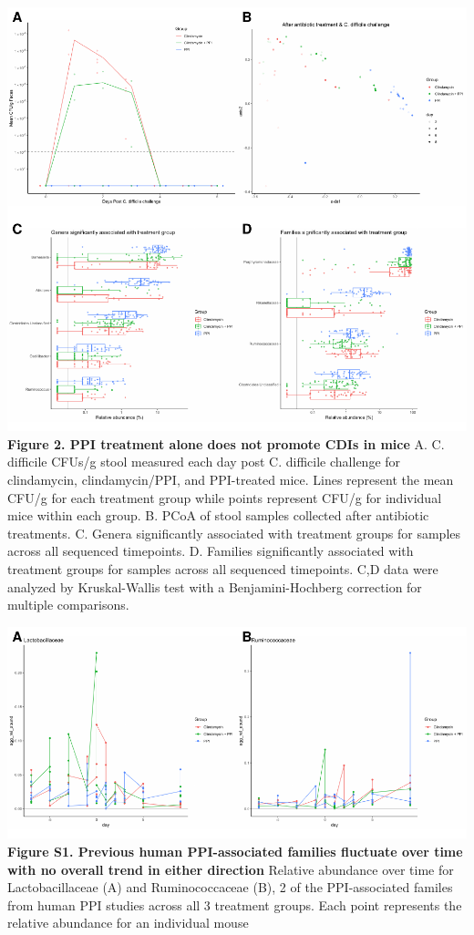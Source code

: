 \documentclass[11pt,]{article}
\begin{document}
\includegraphics{results/figures/figure_2.pdf} \textbf{Figure 2. PPI
treatment alone does not promote CDIs in mice} A. C. difficile CFUs/g
stool measured each day post C. difficile challenge for clindamycin,
clindamycin/PPI, and PPI-treated mice. Lines represent the mean CFU/g
for each treatment group while points represent CFU/g for individual
mice within each group. B. PCoA of stool samples collected after
antibiotic treatments. C. Genera significantly associated with treatment
groups for samples across all sequenced timepoints. D. Families
significantly associated with treatment groups for samples across all
sequenced timepoints. C,D data were analyzed by Kruskal-Wallis test with
a Benjamini-Hochberg correction for multiple comparisons.

\newpage

\includegraphics{figure_s1.pdf} \textbf{Figure S1. Previous human
PPI-associated families fluctuate over time with no overall trend in
either direction} Relative abundance over time for Lactobacillaceae (A)
and Ruminococcaceae (B), 2 of the PPI-associated familes from human PPI
studies across all 3 treatment groups. Each point represents the
relative abundance for an individual mouse
\end{document}
